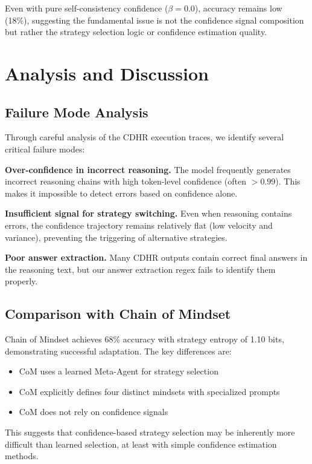 \documentclass{article}
\begin{document}
Even with pure self-consistency confidence ($\beta=0.0$), accuracy remains low (18\%), suggesting the fundamental issue is not the confidence signal composition but rather the strategy selection logic or confidence estimation quality.

\section{Analysis and Discussion}

\subsection{Failure Mode Analysis}

Through careful analysis of the CDHR execution traces, we identify several critical failure modes:

\textbf{Over-confidence in incorrect reasoning.} The model frequently generates incorrect reasoning chains with high token-level confidence (often $>0.99$). This makes it impossible to detect errors based on confidence alone.

\textbf{Insufficient signal for strategy switching.} Even when reasoning contains errors, the confidence trajectory remains relatively flat (low velocity and variance), preventing the triggering of alternative strategies.

\textbf{Poor answer extraction.} Many CDHR outputs contain correct final answers in the reasoning text, but our answer extraction regex fails to identify them properly.

\subsection{Comparison with Chain of Mindset}

Chain of Mindset achieves 68\% accuracy with strategy entropy of 1.10 bits, demonstrating successful adaptation. The key differences are:
\begin{itemize}
    \item CoM uses a learned Meta-Agent for strategy selection
    \item CoM explicitly defines four distinct mindsets with specialized prompts
    \item CoM does not rely on confidence signals
\end{itemize}

This suggests that confidence-based strategy selection may be inherently more difficult than learned selection, at least with simple confidence estimation methods.
\end{document}
